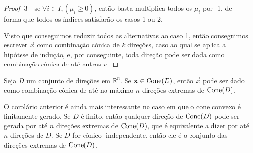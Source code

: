 \begin{thm:caratheodory cones}
\begin{proof}
   3 - se $\forall i \in I, (\mu_i \geq 0)$, então basta multiplica todos os
   $\mu_i$ por -1, de forma que todos os índices satisfarão os casos 1 ou 2.

   Visto que conseguimos reduzir todos as alternativas ao caso 1, então
   conseguimos escrever $\vec{x}$ como combinação cônica de $k$ direções, caso
   ao qual se aplica a hipótese de indução, e, por conseguinte,
   toda direção pode ser dada como combinação cônica de até
   outras $n$.
  \end{proof}
\end{thm:caratheodory cones}

\begin{cor:caratheodory cones}
  Seja $D$ um conjunto de direções em $\mathbb{R}^n$. Se $\mathbf{x} \in \mathrm{Cone}(D)$, então
  $\vec{x}$ pode ser dado como combinação cônica de até no máximo $n$ direções
  extremas de $\mathrm{Cone}(D)$.
\end{cor:caratheodory cones}

O corolário anterior é ainda mais interessante no caso em que o cone convexo
é finitamente gerado. Se $D$ é finito, então qualquer direção de
$\mathrm{Cone}(D)$ pode ser gerada por até $n$ direções extremas de $\mathrm{Cone}(D)$,
que é equivalente a dizer por até $n$ direções de $D$. Se $D$ for cônico-
independente, então ele é o conjunto das direções extremas de $\mathrm{Cone}(D)$.

